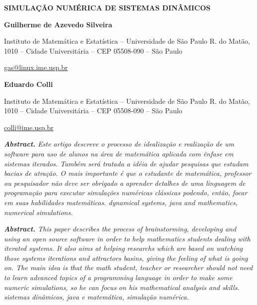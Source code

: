 \documentclass[12pt,twoside]{article}
\begin{document}
\clearpage\pagestyle{Standard}
{\centering{}\bfseries
SIMULA\c{C}\~AO NUM\'ERICA DE SISTEMAS DIN\^AMICOS
\par}


\bigskip

{\centering{}\bfseries
Guilherme de Azevedo Silveira
\par}

{\centering{}
Instituto de Matem\'atica e Estat\'istica {--} Universidade de S\~ao
Paulo\newline
R. do Mat\~ao, 1010 {--} Cidade Universit\'aria {--} CEP 05508{}-090
{--} S\~ao Paulo
\par}

{\centering{}
\href{mailto:gas@linux.ime.usp.br}{gas@linux.ime.usp.br}
\par}

{\centering{}\bfseries
Eduardo Colli
\par}

{\centering{}
Instituto de Matem\'atica e Estat\'istica {--} Universidade de S\~ao
Paulo\newline
R. do Mat\~ao, 1010 {--} Cidade Universit\'aria {--} CEP 05508{}-090
{--} S\~ao Paulo
\par}

{\centering{}
\href{mailto:colli@ime.usp.br}{\foreignlanguage{english}{colli@ime.usp.br}}
\par}


\bigskip

{\itshape
\textbf{Abstract. }\textmd{Este artigo descreve o processo de
idealiza\c{c}\~ao e realiza\c{c}\~ao de um software para uso de alunos
na \'area de matem\'atica aplicada com \^enfase em sistemas iterados.
Tamb\'em ser\'a tratada a id\'eia de ajudar pesquisas que estudam
bacias de atra\c{c}\~ao. O mais importante \'e que o estudante de
matem\'atica, professor ou pesquisador n\~ao deve ser obrigado a
aprender detalhes de uma linguagem de programa\c{c}\~ao para executar
simula\c{c}\~oes num\'ericas cl\'assicas podendo, ent\~ao, focar em
suas habilidades matem\'aticas. dynamical systems, java and
mathematics, numerical simulations.}}

{\itshape
\textbf{Abstract. }This paper describes the process of brainstorming,
developing and using an open source software in order to help
mathematics students dealing with iterated systems. It also aims at
helping researchs which are based on watching those
system{\textquotesingle}s iterations and attractors basins, giving the
feeling of what is going on. The main idea is that the math student,
teacher or researcher should not need to learn advanced topics of a
programming language in order to make some numeric simulations, so he
can focus on his mathematical analysis and skills. sistemas
din\^amicos, java e matem\'atica, simula\c{c}\~ao num\'erica.}
\end{document}
